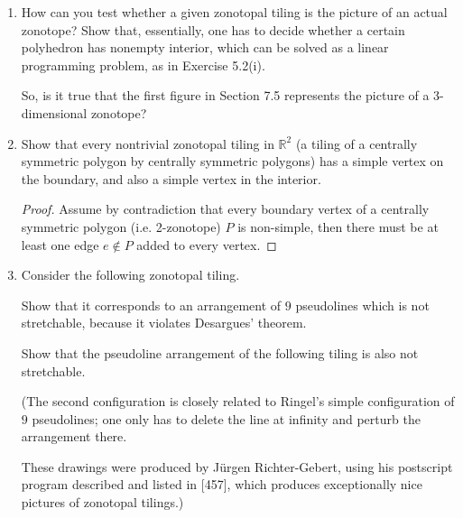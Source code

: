 \documentclass{article}
\begin{document}
\begin{enumerate}
\begin{proof}
(C0) is immediately satisfied. (C1) is satisfied by the inverse property of a vector (sub)space. Now assume if for two vectors $\bi{u}, \bi{v} \in U$, we have that $\supp(\bi{u}) \subseteq \supp(\bi{v})$. Then under multiplication by a suitable constant $\lambda$ we can eliminate a component, such that $\supp(\lambda\bi{u} + \bi{v}) \subsetneq \supp(\bi{v})$, meaning $\bi{v}$ is not a cocircuit. This proves (C2). Now for (C3) we can easily obtain $\bi{w}'$ which eliminates $j \in S(\bi{u}, \bi{v})$ via the vector space axioms. Now we obtain the cocircuit $\bi{w}$ because the descending chain ordered by inclusion of support has a minimum element. Thus we are done.
\end{proof}

\item How can you test whether a given zonotopal tiling is the picture of an actual zonotope? Show that, essentially, one has to decide whether a certain polyhedron has nonempty interior, which can be solved as a linear programming problem, as in Exercise 5.2(i). 

So, is it true that the first figure in Section 7.5 represents the picture of a 3-dimensional zonotope?

\item Show that every nontrivial zonotopal tiling in $\mathbb{R}^2$ (a tiling of a centrally symmetric polygon by centrally symmetric polygons) has a simple vertex on the boundary, and also a simple vertex in the interior.

\begin{proof}
Assume by contradiction that every boundary vertex of a centrally symmetric polygon (i.e. 2-zonotope) $P$ is non-simple, then there must be at least one edge $e \notin P$ added to every vertex.
\end{proof}

\item Consider the following zonotopal tiling.

Show that it corresponds to an arrangement of $9$ pseudolines which is not stretchable, because it violates Desargues' theorem.

Show that the pseudoline arrangement of the following tiling is also not stretchable.

(The second configuration is closely related to Ringel's simple configuration of $9$ pseudolines; one only has to delete the line at infinity and perturb the arrangement there.

These drawings were produced by J\"urgen Richter-Gebert, using his postscript program described and listed in [457], which produces exceptionally nice pictures of zonotopal tilings.)


\end{enumerate}
\end{document}
